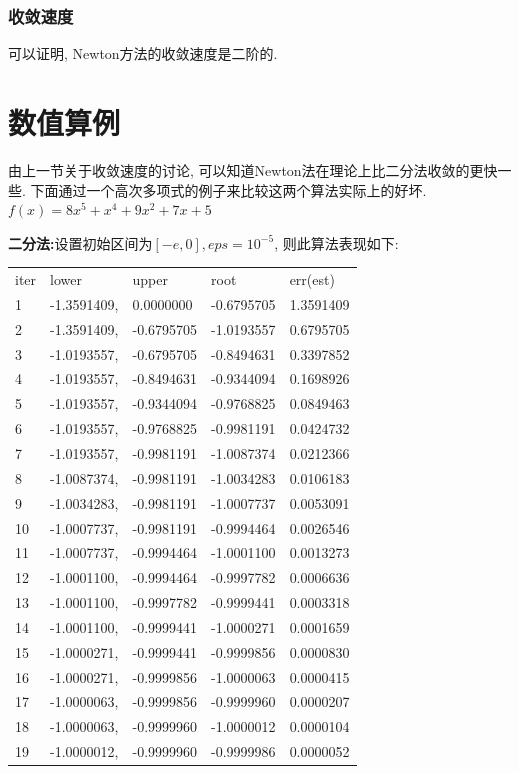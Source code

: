\documentclass{ctexart}
\begin{document}
\subsubsection{收敛速度}
可以证明, Newton方法的收敛速度是二阶的. 

\section{数值算例}
由上一节关于收敛速度的讨论, 可以知道Newton法在理论上比二分法收敛的更快一些. 下面通过一个高次多项式的例子来比较这两个算法实际上的好坏.
$f(x) = 8x^5 + x^4 + 9x^2 + 7x + 5$

\par \textbf{二分法:}设置初始区间为$[-e, 0], eps = 10^{-5}$, 则此算法表现如下:
\begin{table}[h]
    \begin{tabular}{lllll}
    iter & lower       & upper      & root       & err(est)  \\
    1    & -1.3591409, & 0.0000000  & -0.6795705 & 1.3591409 \\
    2    & -1.3591409, & -0.6795705 & -1.0193557 & 0.6795705 \\
    3    & -1.0193557, & -0.6795705 & -0.8494631 & 0.3397852 \\
    4    & -1.0193557, & -0.8494631 & -0.9344094 & 0.1698926 \\
    5    & -1.0193557, & -0.9344094 & -0.9768825 & 0.0849463 \\
    6    & -1.0193557, & -0.9768825 & -0.9981191 & 0.0424732 \\
    7    & -1.0193557, & -0.9981191 & -1.0087374 & 0.0212366 \\
    8    & -1.0087374, & -0.9981191 & -1.0034283 & 0.0106183 \\
    9    & -1.0034283, & -0.9981191 & -1.0007737 & 0.0053091 \\
    10   & -1.0007737, & -0.9981191 & -0.9994464 & 0.0026546 \\
    11   & -1.0007737, & -0.9994464 & -1.0001100 & 0.0013273 \\
    12   & -1.0001100, & -0.9994464 & -0.9997782 & 0.0006636 \\
    13   & -1.0001100, & -0.9997782 & -0.9999441 & 0.0003318 \\
    14   & -1.0001100, & -0.9999441 & -1.0000271 & 0.0001659 \\
    15   & -1.0000271, & -0.9999441 & -0.9999856 & 0.0000830 \\
    16   & -1.0000271, & -0.9999856 & -1.0000063 & 0.0000415 \\
    17   & -1.0000063, & -0.9999856 & -0.9999960 & 0.0000207 \\
    18   & -1.0000063, & -0.9999960 & -1.0000012 & 0.0000104 \\
    19   & -1.0000012, & -0.9999960 & -0.9999986 & 0.0000052
    \end{tabular}
    \end{table}
\end{document}
